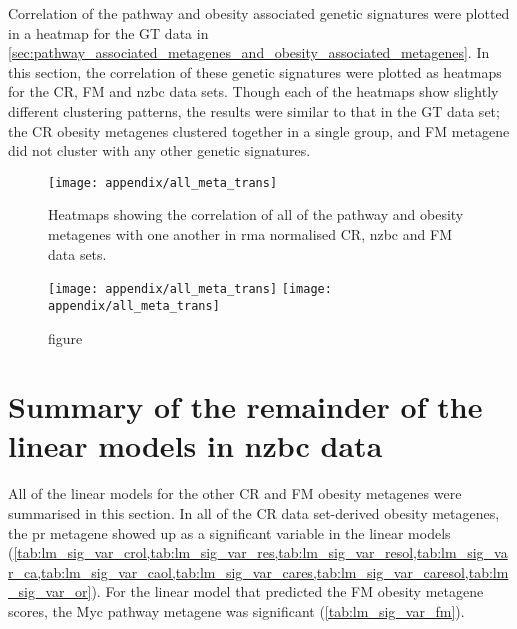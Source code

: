 	Correlation of the pathway and obesity associated genetic signatures were plotted in a heatmap for the GT data in \cref{sec:pathway_associated_metagenes_and_obesity_associated_metagenes}.
	In this section, the correlation of these genetic signatures were plotted as heatmaps for the CR, FM and \gls{nzbc} data sets.
	Though each of the heatmaps show slightly different clustering patterns, the results were similar to that in the GT data set; the CR obesity metagenes clustered together in a single group, and FM metagene did not cluster with any other genetic signatures.

	\begin{figure}[htp!]
		\centering
		\texttt{[image: appendix/all\_meta\_trans]}
		\caption[]{Heatmaps showing the correlation of all of the pathway and obesity metagenes with one another in \gls{rma} normalised CR, \gls{nzbc} and FM data sets.
		}
		\label{fig:appendix/gt_meta_rma_mas}
	\end{figure}

	\begin{figure}[htpb]
		\ContinuedFloat
		\captionsetup{list=off,format=cont}
		\centering
		\texttt{[image: appendix/all\_meta\_trans]}
		\texttt{[image: appendix/all\_meta\_trans]}
		\caption[]{figure}
	\end{figure}

	\newpage

	\section{Summary of the remainder of the linear models in \gls{nzbc} data}
	\label{sec:summary_of_the_linear_models_in_nzbc_data}

	All of the linear models for the other CR and FM obesity metagenes were summarised in this section.
	In all of the CR data set-derived obesity metagenes, the \gls{pr} metagene showed up as a significant variable in the linear models (\cref{tab:lm_sig_var_crol,tab:lm_sig_var_res,tab:lm_sig_var_resol,tab:lm_sig_var_ca,tab:lm_sig_var_caol,tab:lm_sig_var_cares,tab:lm_sig_var_caresol,tab:lm_sig_var_or}).
	For the linear model that predicted the FM obesity metagene scores, the Myc pathway metagene was significant (\cref{tab:lm_sig_var_fm}).

